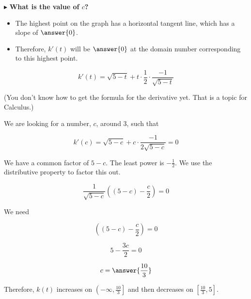 \documentclass{ximera}
\begin{document}
$\blacktriangleright$ \textbf{\textcolor{blue!55!black}{What is the value of $c$?}} 

\begin{explanation}


\begin{itemize}
\item The highest point on the graph has a horizontal tangent line, which has a slope of $\answer{0}$.  
\item Therefore, $k'(t)$ will be $\answer{0}$ at the domain number corresponding to this highest point.
\end{itemize}




\[   k'(t) = \sqrt{5-t} + t \cdot \frac{1}{2} \cdot \frac{-1}{\sqrt{5-t}}    \]

(You don't know how to get the formula for the derivative yet.  That is a topic for Calculus.)

We are looking for a number, $c$, around $3$, such that 


\[   k'(c) = \sqrt{5-c} + c \cdot \frac{-1}{2 \sqrt{5-c}}  = 0  \]

We have a common factor of $5-c$.  The least power is $-\frac{1}{2}$.  We use the distributive property to factor this out.


\[  \frac{1}{\sqrt{5-c}} \left( (5-c) - \frac{c}{2} \right) = 0  \]




We need 


\[  \left( (5-c) - \frac{c}{2} \right) = 0  \]

\[  5 - \frac{3c}{2}  = 0  \]


\[  c = \answer{\frac{10}{3}}  \]


\end{explanation}


Therefore, $k(t)$ increases on $\left(-\infty, \frac{10}{3}\right]$ and then decreases on $\left[\frac{10}{3},5\right]$.
\end{document}

